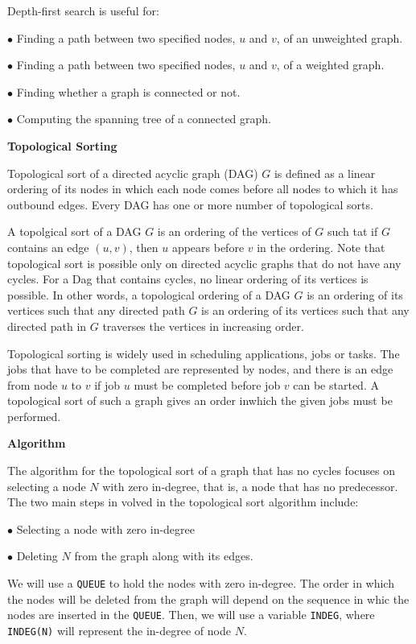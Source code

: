 \vskip 1mm
Depth-first search is useful for:

\vskip 3mm
\qquad$\bullet$ Finding a path between two specified nodes, $u$ and $v$, of an unweighted graph.

\vskip 3mm
\qquad$\bullet$ Finding a path between two specified nodes, $u$ and $v$, of a weighted graph.

\vskip 3mm
\qquad$\bullet$ Finding whether a graph is connected or not.

\vskip 3mm
\qquad$\bullet$ Computing the spanning tree of a connected graph.

\filbreak
\vskip 1cm
{\bf Topological Sorting}

\vskip 1mm
Topological sort of a directed acyclic graph (DAG) $G$ is defined as a linear ordering of its nodes in which each node comes before all nodes to which it has outbound edges. Every DAG has one or more number of topological sorts.

\vskip 1mm
A topolgical sort of a DAG $G$ is an ordering of the vertices of $G$ such tat if $G$ contains an edge $(u,v)$, then $u$ appears before $v$ in the ordering. Note that topological sort is possible only on directed acyclic graphs that do not have any cycles. For a Dag that contains cycles, no linear ordering of its vertices is possible. In other words, a topological ordering of a DAG $G$ is an ordering of its vertices such that any directed path $G$ is an ordering of its vertices such that any directed path in $G$ traverses the vertices in increasing order.

\vskip 1mm
Topological sorting is widely used in scheduling applications, jobs or tasks. The jobs that have to be completed are represented by nodes, and there is an edge from node $u$ to $v$ if job $u$ must be completed before job $v$ can be started. A topological sort of such a graph gives an order inwhich the given jobs must be performed.

\vskip 3mm
{\bf Algorithm}

\vskip 1mm
The algorithm for the topological sort of a graph that has no cycles focuses on selecting a node $N$ with zero in-degree, that is, a node that has no predecessor. The two main steps in volved in the topological sort algorithm include:

\vskip 3mm
\qquad$\bullet$ Selecting a node with zero in-degree

\vskip 3mm
\qquad$\bullet$ Deleting $N$ from the graph along with its edges.

\vskip 1mm
We will use a {\tt QUEUE} to hold the nodes with zero in-degree. The order in which the nodes will be deleted from the graph will depend on the sequence in whic the nodes are inserted in the {\tt QUEUE}. Then, we will use a variable {\tt INDEG}, where {\tt INDEG(N)} will represent the in-degree of node $N$.

